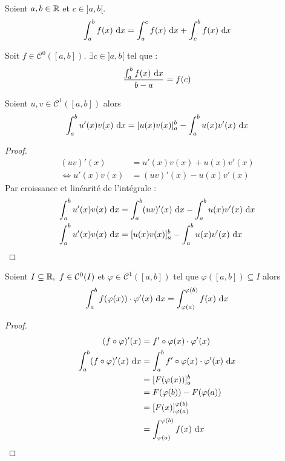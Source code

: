 \begin{proposition}
	Soient $a, b \in \mathbb{R}$ et $c \in ]a, b[$.
	\begin{align*}
		\int_a^b f(x) \ \diffd x = \int_a^c f(x) \ \diffd x + \int_c^b f(x) \ \diffd x
	\end{align*}
\end{proposition}

\begin{theorem}
    Soit $f \in \mathcal{C}^0([a, b])$. $\exists c \in ]a, b[$  tel que :
    \[ \frac{\int_{a}^{b} f(x) \ \diffd x}{b - a} = f(c) \]
\end{theorem}

\begin{theorem}
	Soient $u, v \in \mathcal{C}^1([a, b])$ alors
	\begin{align*}
		\int_a^b u'(x) v(x) \ \diffd x = [u(x)v(x)]_a^b - \int_a^b u(x) v'(x) \ \diffd x
	\end{align*}
  \end{theorem}

\begin{proof}
    \begin{align*}
        (uv)'(x) &= u'(x) v(x) + u(x)v'(x) \\
        \iff u'(x)v(x) &= (uv)'(x) - u(x)v'(x)
    \end{align*}
    Par croissance et linéarité de l'intégrale :
    \begin{align*}
        \int_a^b u'(x)v(x) \ \diffd x &= \int_a^b (uv)'(x) \ \diffd x - \int_a^b u(x)v'(x) \ \diffd x \\
        \int_a^b u'(x)v(x) \ \diffd x &=  [u(x)v(x)]_a^b - \int_a^b u(x)v'(x) \ \diffd x 
    \end{align*}
\end{proof}

\begin{theorem}
	Soient $I \subseteq \mathbb{R},\ f \in \mathcal{C}^0(I)$ et $\varphi \in \mathcal{C}^1([a, b])$ tel que $\varphi ([a, b]) \subseteq I$ alors 
	\begin{align*}
		\int_a^b f(\varphi(x)) \cdot \varphi'(x) \ \diffd x = \int_{\varphi(a)}^{\varphi(b)} f(x) \ \diffd x
	\end{align*}
\end{theorem}

\begin{proof}
    \begin{align*}
        (f \circ \varphi)'(x) &= f' \circ \varphi(x) \cdot \varphi'(x) \\
        \int_a^b (f \circ \varphi)'(x) \ \diffd x &= \int_a^b f' \circ \varphi(x)  \cdot \varphi'(x) \ \diffd x \\
         &= [F(\varphi(x))]_a^b \\
         &= F(\varphi(b)) - F(\varphi(a)) \\
         &= [F(x)]_{\varphi(a)}^{\varphi(b)} \\
         &= \int_{\varphi(a)}^{\varphi(b)} f(x) \ \diffd x 
    \end{align*}
\end{proof}

